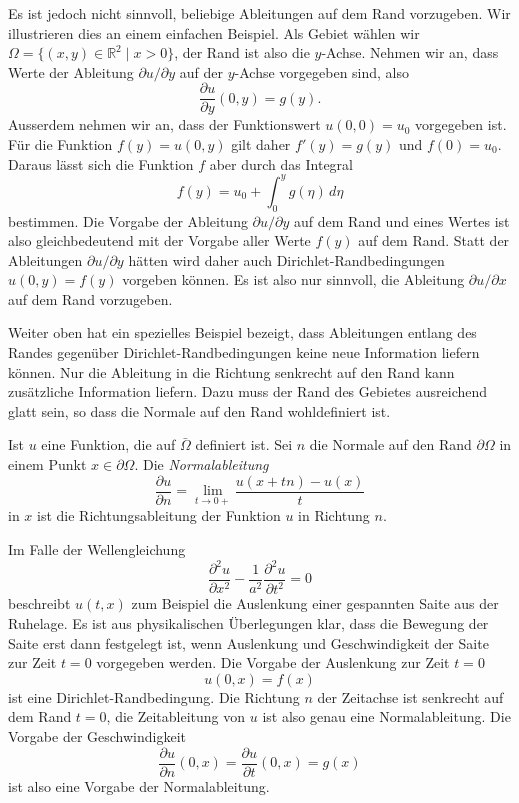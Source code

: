 Es ist jedoch nicht sinnvoll, beliebige Ableitungen auf dem Rand
vorzugeben.
Wir illustrieren dies an einem einfachen Beispiel.
Als Gebiet wählen wir $\Omega = \{(x,y)\in\mathbb R^2\;|\; x > 0\}$,
der Rand ist also die $y$-Achse.
Nehmen wir an, dass Werte der Ableitung $\partial u/\partial y$ 
auf der $y$-Achse vorgegeben sind, also
\[
\frac{\partial u}{\partial y}(0,y)  = g(y).
\]
Ausserdem nehmen wir an, dass der Funktionswert $u(0,0)=u_0$ vorgegeben ist.
Für die Funktion $f(y) = u(0,y)$ gilt daher $f'(y) = g(y)$ und $f(0)=u_0$.
Daraus lässt sich die Funktion $f$ aber durch das Integral
\[
f(y) = u_0 + \int_0^y g(\eta)\,d\eta
\]
bestimmen.
Die Vorgabe der Ableitung $\partial u/\partial y$ auf dem Rand und eines
Wertes ist also gleichbedeutend mit der Vorgabe aller Werte $f(y)$ auf dem
Rand.
Statt der Ableitungen $\partial u/\partial y$ hätten wird daher auch
Dirichlet-Randbedingungen $u(0,y) = f(y)$ vorgeben können.
Es ist also nur sinnvoll, die Ableitung $\partial u/\partial x$ 
auf dem Rand vorzugeben.

Weiter oben hat ein spezielles Beispiel bezeigt,
dass Ableitungen entlang des Randes gegenüber Dirichlet-Randbedingungen
keine neue Information liefern können.
Nur die Ableitung in die Richtung senkrecht auf den Rand kann zusätzliche
Information liefern.
Dazu muss der Rand des Gebietes ausreichend glatt sein, so dass die
Normale auf den Rand wohldefiniert ist.

\begin{definition}
Ist $u$ eine Funktion, die auf $\bar\Omega$ definiert ist.
Sei $n$ die Normale auf den Rand $\partial\Omega$ in einem Punkt
$x\in\partial\Omega$.
Die {\em Normalableitung}
\[
\frac{\partial u}{\partial n}
=
\lim_{t\to 0+} \frac{u(x+tn)-u(x)}{t}
\]
in $x$ ist die Richtungsableitung 
der Funktion $u$ in Richtung $n$.
\end{definition}

Im Falle der Wellengleichung
\[
\frac{\partial^2 u}{\partial x^2}
-
\frac{1}{a^2}
\frac{\partial^2 u}{\partial t^2}
=0
\]
beschreibt $u(t,x)$ zum Beispiel die Auslenkung einer gespannten Saite
aus der Ruhelage.
Es ist aus physikalischen Überlegungen klar, dass die Bewegung der Saite
erst dann festgelegt ist, wenn Auslenkung und Geschwindigkeit der Saite
zur Zeit $t=0$ vorgegeben werden.
Die Vorgabe der Auslenkung zur Zeit $t=0$
\[
u(0,x) = f(x)
\]
ist eine Dirichlet-Randbedingung.
Die Richtung $n$ der Zeitachse ist senkrecht auf dem Rand $t=0$,
die Zeitableitung von $u$ ist also genau eine Normalableitung.
Die Vorgabe der Geschwindigkeit
\[
\frac{\partial u}{\partial n}(0,x)
=
\frac{\partial u}{\partial t}(0,x)
=
g(x)
\]
ist also eine Vorgabe der Normalableitung.


